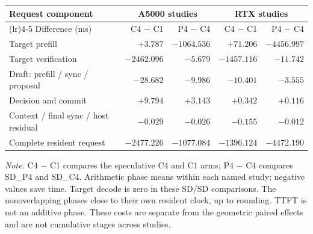 \begingroup
\fontsize{8.7}{10.5}\selectfont
\setlength{\tabcolsep}{3.5pt}\renewcommand{\arraystretch}{1.03}
\noindent
\begin{tabularx}{\linewidth}{@{}>{\raggedright\arraybackslash}Xrrrr@{}}
\toprule
Request component & \multicolumn{2}{c}{A5000 studies} & \multicolumn{2}{c}{RTX studies}\\
\cmidrule(lr){2-3}\cmidrule(lr){4-5}
Difference (ms) & C4 $-$ C1 & P4 $-$ C4 & C4 $-$ C1 & P4 $-$ C4\\
\midrule
Target prefill & $+3.787$ & $-1064.536$ & $+71.206$ & $-4456.997$\\
Target verification & $-2462.096$ & $-5.679$ & $-1457.116$ & $-11.742$\\
Draft: prefill / sync / proposal & $-28.682$ & $-9.986$ & $-10.401$ & $-3.555$\\
Decision and commit & $+9.794$ & $+3.143$ & $+0.342$ & $+0.116$\\
Context / final sync / host residual & $-0.029$ & $-0.026$ & $-0.155$ & $-0.012$\\
\midrule
Complete resident request & $-2477.226$ & $-1077.084$ & $-1396.124$ & $-4472.190$\\
\bottomrule
\end{tabularx}
\par\smallskip
\fontsize{8}{9.6}\selectfont\raggedright
\textit{Note.} C4 $-$ C1 compares the speculative C4 and C1 arms; P4 $-$ C4 compares SD\_P4 and SD\_C4. Arithmetic phase means within each named study; negative values save time. Target decode is zero in these SD/SD comparisons. The nonoverlapping phases close to their own resident clock, up to rounding. TTFT is not an additive phase. These costs are separate from the geometric paired effects and are not cumulative stages across studies.
\par\endgroup
